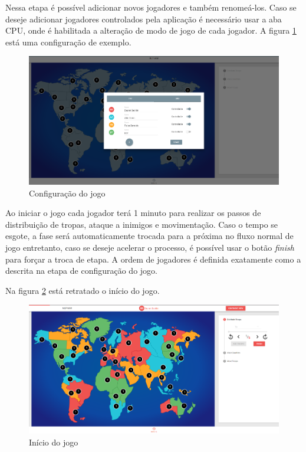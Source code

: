 \documentclass[rel_mlp]{iiufrgs}
\begin{document}
Nessa etapa é possível adicionar novos jogadores e também renomeá-los. Caso se deseje adicionar jogadores controlados pela aplicação é necessário usar a aba CPU, onde é habilitada a alteração de modo de jogo de cada jogador.
A figura \ref{fig:setup} está uma configuração de exemplo.

\begin{figure}[h!]
\centering
  \includegraphics[width=1.0\textwidth]{images/setup.png}
  \caption{Configuração do jogo}
  \label{fig:setup}
\end{figure}

Ao iniciar o jogo cada jogador terá 1 minuto para realizar os passos de distribuição de tropas, ataque a inimigos e movimentação. Caso o tempo se esgote, a fase será automaticamente trocada para a próxima no fluxo normal de jogo entretanto, caso se deseje acelerar o processo, é possível usar o botão \textit{finish} para forçar a troca de etapa.
A ordem de jogadores é definida exatamente como a descrita na etapa de configuração do jogo.

Na figura \ref{fig:initGame} está retratado o início do jogo.

\begin{figure}[h!]
\centering
  \includegraphics[width=1.0\textwidth]{images/initGame.png}
  \caption{Início do jogo}
  \label{fig:initGame}
\end{figure}
\end{document}
